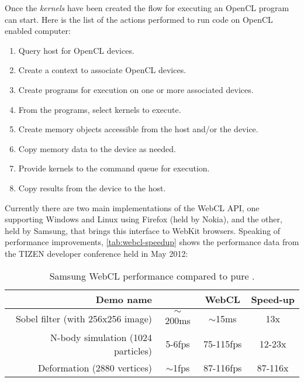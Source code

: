 Once the \emph{kernels} have been created the flow for executing an \ac{OpenCL}
program can start. Here is the list of the actions performed to run code on
\ac{OpenCL} enabled computer:
\begin{enumerate}
    \item Query host for \ac{OpenCL} devices.
    \item Create a context to associate \ac{OpenCL} devices.
    \item Create programs for execution on one or more associated devices.
    \item From the programs, select kernels to execute.
    \item Create memory objects accessible from the host and/or the device.
    \item Copy memory data to the device as needed.
    \item Provide kernels to the command queue for execution.
    \item Copy results from the device to the host.
\end{enumerate}

Currently there are two main implementations of the \ac{WebCL} API, one supporting Windows
and Linux using Firefox (held by Nokia), and the other, held by Samsung, that
brings this interface to WebKit browsers. Speaking of performance improvements,
\autoref{tab:webcl-speedup} shows the performance data from the TIZEN\tm{} developer
conference held in May 2012:
\begin{table}[htb]
    \caption{Samsung WebCL performance compared to pure \js{}.}
    \label{tab:webcl-speedup}
    \centering
    \begin{tabular}{r|c|c|c}
        \textbf{Demo name} & \textbf{\js{}} & \textbf{WebCL} & \textbf{Speed-up}\\
        \hline
        Sobel filter (with 256x256 image) & $\sim{}$200ms & $\sim{}$15ms & 13x\\
        \hline
        N-body simulation (1024 particles) & 5-6fps & 75-115fps & 12-23x\\
        \hline
        Deformation (2880 vertices) & $\sim{}$1fps & 87-116fps & 87-116x
    \end{tabular}
\end{table}
